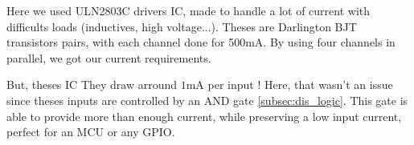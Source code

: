 Here we used ULN2803C drivers IC, made to handle a lot of current with difficults loads 
(inductives, high voltage...). Theses are Darlington BJT transistors pairs, with each 
channel done for 500mA. By using four channels in parallel, we got our current requirements.

But, theses IC They draw arround $ 1 \si{\milli\ampere}$ per input ! Here, that wasn't 
an issue since theses inputs are controlled by an AND gate \ref{subsec:dis_logic}. This 
gate is able to provide more than enough current, while preserving a low input current, 
perfect for an MCU or any GPIO.
